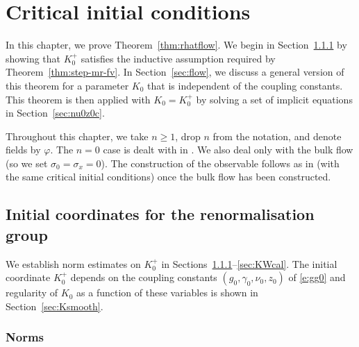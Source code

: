 \chapter{Critical initial conditions}
\label{sec:RGflow}

\renewcommand{\pm}{+}


In this chapter, we prove Theorem~\ref{thm:rhatflow}.
We begin in Section~\ref{sec:norms} by
showing that $K^+_0$ satisfies the inductive assumption required by
Theorem~\ref{thm:step-mr-fv}. In Section~\ref{sec:flow}, we discuss a general
version of this theorem for a parameter $K_0$ that is independent of the
coupling constants. This theorem is then applied with $K_0 = K^+_0$ by solving
a set of implicit equations in Section~\ref{sec:nu0z0c}.

Throughout this chapter, we take $n \ge 1$, drop $n$ from the notation, and
denote fields by $\varphi$. The $n = 0$ case is dealt with in \cite{BSW-saw-sa}.
We also deal only with the bulk flow (so we set $\sigma_0 = \sigma_x = 0$).
The construction of the observable follows as in \cite{ST-phi4} (with the same
critical initial conditions) once the bulk flow has been constructed.


\section{Initial coordinates for the renormalisation group}
\label{sec:K0bd}

We establish norm estimates on $K^{\pm}_0$ in Sections~\ref{sec:norms}--\ref{sec:KWcal}.
The initial coordinate $K^{\pm}_0$ depends on the coupling constants
$(g_0, \gamma_0, \nu_0, z_0)$ of \eqref{e:gg0} and regularity of $K_0$ as a
function of these variables is shown in Section~\ref{sec:Ksmooth}.


\subsection{Norms}
\label{sec:norms}

